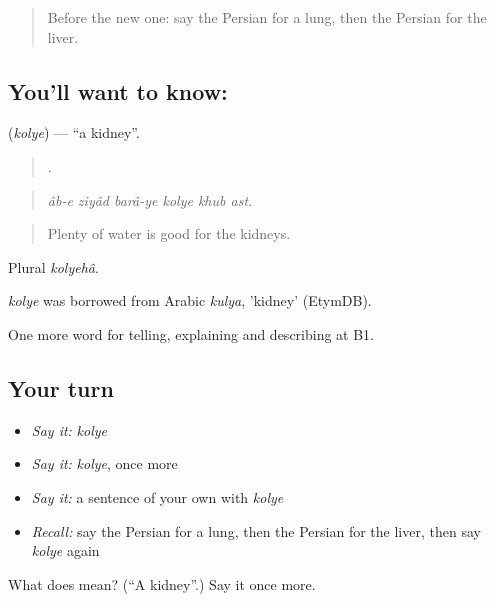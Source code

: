 \begin{quote}
Before the new one: say the Persian for a lung, then the Persian for the liver.
\end{quote}

\subsection*{You'll want to know: }
\textbf{} (\emph{kolye}) — \textquotedblleft{}a kidney\textquotedblright{}.

\begin{quote}
     .
\end{quote}

\begin{quote}
\emph{âb-e ziyâd barâ-ye kolye khub ast.}
\end{quote}

\begin{quote}
Plenty of water is good for the kidneys.
\end{quote}

Plural \emph{kolyehâ}.

\begin{cousinweb}
\emph{kolye} was borrowed from Arabic \emph{kulya}, 'kidney' (EtymDB).
\end{cousinweb}

\begin{grammarlens}[title={What you've built}]
One more word for telling, explaining and describing at B1.
\end{grammarlens}

\subsection*{Your turn}
\begin{itemize}
\raggedright
  \item \emph{Say it:} \emph{kolye}
  \item \emph{Say it:} \emph{kolye}, once more
  \item \emph{Say it:} a sentence of your own with \emph{kolye}
  \item \emph{Recall:} say the Persian for a lung, then the Persian for the liver, then say \emph{kolye} again
\end{itemize}

\begin{tcolorbox}[breakable,colback=teal!4,colframe=teal!35!black,title={Before you move on}]
What does  mean? (\textquotedblleft{}A kidney\textquotedblright{}.) Say it once more.
\end{tcolorbox}
